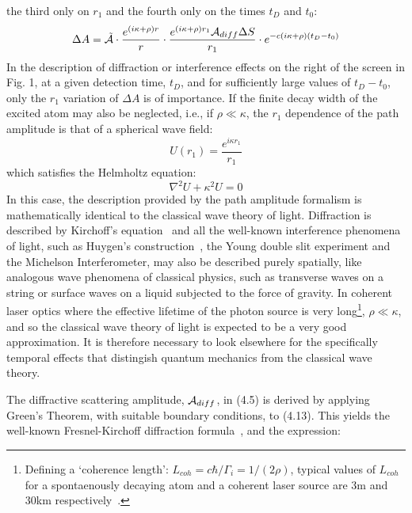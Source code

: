 \documentclass [12pt]{article}
\begin{document}
{ the third only
 on $r_1$ and the fourth only on the times $t_D$ and $t_0$:
 \begin{equation}
  \Delta A = \tilde{{\cal A}}\cdot \frac{e^{(i \kappa+ \rho)r}}{r} 
    \cdot \frac{e^{(i \kappa+ \rho)r_1}{\cal A}_{diff}\Delta S }{r_1}
    \cdot e^{-c(i \kappa+ \rho)(t_D-t_0)}
 \end{equation}
In the description of diffraction or interference effects on the right of the screen in Fig. 1, at a given
 detection time, $t_D$, and for sufficiently large values of $t_D-t_0$, only the
 $r_1$ variation of $\Delta A$ is of importance. If the finite decay width 
  of the excited atom may also be neglected, i.e., if $ \rho  \ll  \kappa$, the $r_1$ dependence of the
  path amplitude is that of a spherical wave field:
  \begin{equation}
   U(r_1) =  \frac{e^{i \kappa r_1}}{r_1}
 \end{equation}
 which satisfies the Helmholtz equation:
  \begin{equation}
  \nabla^2 U+\kappa^2 U = 0 
\end{equation}
 In this case, the description provided by the path amplitude formalism is mathematically
 identical to the classical wave theory of light. Diffraction is
  described by Kirchoff's equation~\cite{BW2,MW1} and all the well-known interference 
  phenomena of light, such as Huygen's construction~\cite{BW1}, the Young double slit experiment and
  the Michelson Interferometer, may also be described purely spatially,
  like analogous wave phenomena of classical physics, such as transverse waves on a
  string or surface
  waves on a liquid subjected to the force of gravity. In coherent laser optics where the
   effective lifetime of the photon source is very long\footnote{Defining a `coherence
   length': $L_{coh} = c \hbar/\Gamma_i = 1/(2\rho)$, typical values of $L_{coh}$ for 
  a spontaenously decaying atom and a coherent laser source are 3m and 30km respectively~\cite{MW2}.},
   $\rho \ll \kappa$,
   and so the classical wave theory of light is expected to be a very good approximation. It is therefore
  necessary to look elsewhere for the specifically temporal effects that distingish
  quantum mechanics from the classical wave theory.
  \par The diffractive scattering amplitude, ${\cal A}_{diff}$, in (4.5) is derived by applying Green's 
   Theorem, with suitable boundary conditions,
    to (4.13). This yields the well-known Fresnel-Kirchoff diffraction formula~\cite{BW2}, 
   and the expression:
       \begin{equation}

\end{equation}}
\end{document}
